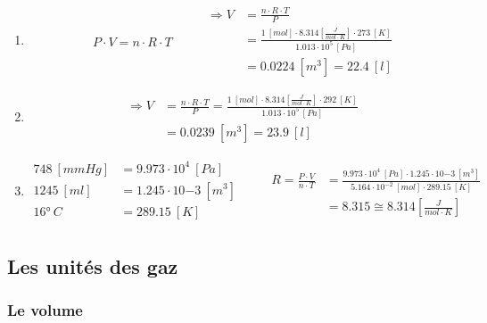 \documentclass[
  11pt,
  a4paper,
  openany]{book}
\begin{document}
\begin{Answer}

\begin{enumerate}
\def\labelenumi{\arabic{enumi}.}
\item
  \[
  \begin{split}
   P \cdot V = n \cdot R \cdot T
  \end{split}
  \qquad
  \begin{split}
   \Rightarrow V &= \frac{n \cdot R \cdot T}{P} \\
   &= \frac{1\ [mol] \cdot 8.314 \left[\frac{J}{mol \cdot K}\right] \cdot 273\ [K]}{1.013 \cdot 10^{5}\ [Pa]} \\
   &= 0.0224\ [m^3] = 22.4\ [l]
  \end{split}
  \]
\item
  \[
  \begin{split}
   \Rightarrow V &= \frac{n \cdot R \cdot T}{P}
   = \frac{1\ [mol] \cdot 8.314 \left[\frac{J}{mol \cdot K}\right] \cdot 292\ [K]}{1.013 \cdot 10^{5}\ [Pa]} \\
   &= 0.0239\ [m^3] = 23.9\ [l]
  \end{split}
  \]
\item
  \[
  \begin{split}
   748\ [mmHg] &= 9.973 \cdot 10^{4}\ [Pa]\\[0.33em]
   1245\ [ml] &= 1.245 \cdot 10{-3}\ [m^3]\\[0.33em]
   16°\ C\ &= 289.15\ [K]\\
  \end{split}
  \qquad
  \begin{split}
   R = \frac{P \cdot V}{n \cdot T} &= \frac{9.973 \cdot 10^{4}\ [Pa] \cdot 1.245 \cdot 10{-3}\ [m^3]}{5.164 \cdot 10^{-2}\ [mol] \cdot 289.15\ [K]}\\[0.33em]
   &= 8.315 \cong 8.314 \left[\frac{J}{mol \cdot K}\right]
  \end{split}
  \]
\end{enumerate}

\end{Answer}

\subsection{Les unités des gaz}\label{les-unituxe9s-des-gaz}

\subsubsection{Le volume}\label{le-volume}
\end{document}
